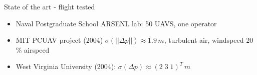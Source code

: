 \documentclass[12pt,svgnames,table,draft=false]{beamer}
\begin{document}

\begin{frame}{State of the art - flight tested}
\centering

\begin{tcolorbox}[width=.99\textwidth,
colback={gray!10!},
standard jigsaw,
title=Guidance,
opacityback=.8,  %
]  
    \begin{itemize}
    \item Naval Postgraduate School ARSENL lab: 50 UAVS, one operator\cite{ARSENL50UAVS}
    \end{itemize}
    \end{tcolorbox}
    
    \begin{tcolorbox}[width=.99\textwidth,
    colback={gray!10!},
    standard jigsaw,
    title=Control performance,
    opacityback=.8,  %
    ]  
        \begin{itemize}
          \item MIT PCUAV project \cite{Park2004} (2004) $\sigma(||\Delta p||) \approx 1.9 \, m$, turbulent air, windspeed 20 \% airspeed
    
          \item West Virginia University \cite{gu2006design} (2004): $\sigma(\Delta p) \approx       
          (2 \; 3 \; 1)^T
           \, m$
           
        \end{itemize}
        \end{tcolorbox}
    
\end{frame}
\end{document}
